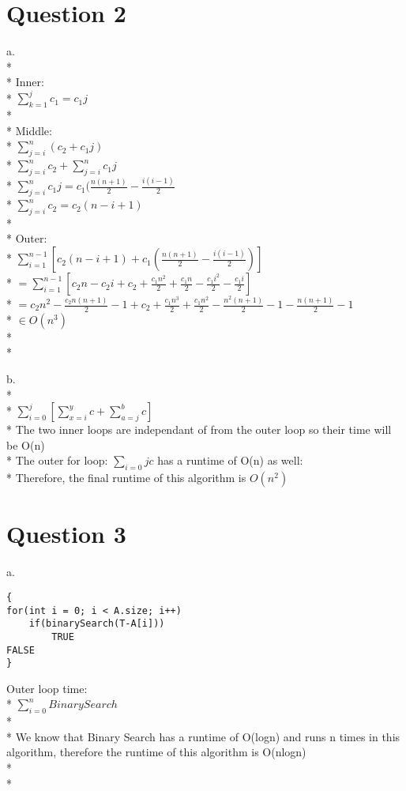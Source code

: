\documentclass[11pt]{article}
\newcommand\tab[1][1cm]{\hspace*{#1}}
\begin{document}
\section*{Question 2}
\tab a.\\*\\*
Inner:\\*
\tab $\sum_{k=1}^{j} c_1 = c_1j$\\*\\*
Middle:\\*
\tab $\sum_{j=i}^{n} (c_2 + c_1j)$\\*
\tab $\sum_{j=i}^{n} {c_2 + \sum_{j=i}^{n} c_1j}$\\*
\tab $\sum_{j=i}^{n} {c_1j} = c_1(\frac{n(n+1)}{2} - \frac{i(i-1)}{2}$\\*
\tab $\sum_{j=i}^{n} {c_2} = c_2(n - i + 1)$\\*\\*
Outer:\\*
\tab $\sum_{i=1}^{n-1}[c_2(n - i + 1) + c_1(\frac{n(n+1)}{2} - \frac{i(i-1)}{2})]$\\*
\tab $= \sum_{i=1}^{n-1}[c_2n - c_2i + c_2 + \frac{c_1n^2}{2} + \frac{c_1n}{2} - \frac{c_1i^2}{2} - \frac{c_1i}{2}]$\\*
\tab$ = c_2n^2 - \frac{c_2n(n+1)}{2} - 1 + c_2 + \frac{c_1n^3}{2} + \frac{c_1n^2}{2} - \frac{n^2(n+1)}{2} - 1 - \frac{n(n+1)}{2} - 1$\\*
\tab $\in O(n^3)$\\*\\*


\newpage
b.\\*\\*
\tab $\sum_{i=0}^{j}[\sum_{x=i}^{y} c + \sum_{a=j}^{b}c]$\\*
The two inner loops are independant of from the outer loop so their time will be O(n)\\*
The outer for loop: $\sum_{i=0}{j} c$ has a runtime of O(n) as well:\\*
Therefore, the final runtime of this algorithm is $O(n^2)$




\section*{Question 3}
\tab a.
\begin{lstlisting}
{
for(int i = 0; i < A.size; i++)
	if(binarySearch(T-A[i]))
		TRUE
FALSE
}
\end{lstlisting}
Outer loop time:\\*
\tab $\sum_{i=0}^{n}Binary Search$\\*\\*
\tab We know that Binary Search has a 
runtime of O(logn) and runs n times in 
this algorithm, therefore the runtime 
of this algorithm is O(nlogn)\\*\\*
\end{document}
